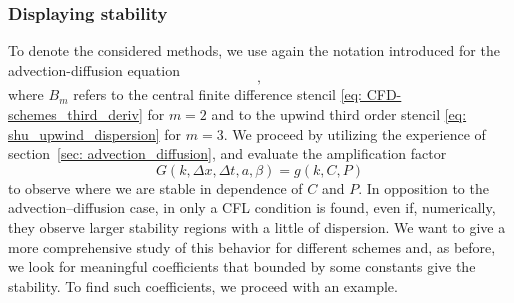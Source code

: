 \subsubsection{Displaying stability}
To denote the considered methods, we use again the notation introduced for the advection-diffusion equation
	\begin{equation*}
[\TMM,\NODES,N, A_n,B_m],
\end{equation*}
where $B_m$ refers to the central finite difference stencil \eqref{eq: CFD-schemes_third_deriv} for $m=2$ and to the upwind third order stencil \eqref{eq: shu_upwind_dispersion} for $m=3$.
We proceed by utilizing the experience of section~\ref{sec: advection_diffusion}, and evaluate the amplification factor 
\begin{equation*}
G(k,\Delta x, \Delta t, a, \beta)=g(k,C,P)
\end{equation*}
to observe where we are stable in dependence of $C$ and $P$. 
In opposition to the advection--diffusion case, in \cite{TanChenShu_ImEx_Stability} only a CFL condition is found, even if, numerically, they observe larger stability regions with a little of dispersion.
We want to give a more comprehensive study of this behavior for different schemes and, as before, we look for meaningful coefficients that bounded by some constants give the stability. 
To find such coefficients, we proceed with an example.
